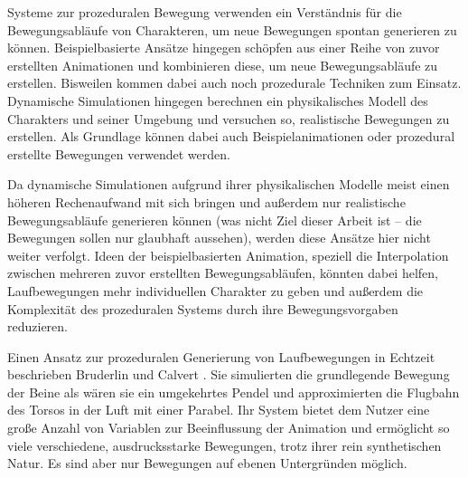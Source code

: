 Systeme zur prozeduralen Bewegung verwenden ein Verständnis für die Bewegungsabläufe von Charakteren, um neue Bewegungen spontan generieren zu können. Beispielbasierte Ansätze hingegen schöpfen aus einer Reihe von zuvor erstellten Animationen und kombinieren diese, um neue Bewegungsabläufe zu erstellen. Bisweilen kommen dabei auch noch prozedurale Techniken zum Einsatz. Dynamische Simulationen hingegen berechnen ein physikalisches Modell des Charakters und seiner Umgebung und versuchen so, realistische Bewegungen zu erstellen. Als Grundlage können dabei auch Beispielanimationen oder prozedural erstellte Bewegungen verwendet werden.

Da dynamische Simulationen aufgrund ihrer physikalischen Modelle meist einen höheren Rechenaufwand mit sich bringen und außerdem nur realistische Bewegungsabläufe generieren können (was nicht Ziel dieser Arbeit ist – die Bewegungen sollen nur glaubhaft aussehen), werden diese Ansätze hier nicht weiter verfolgt. Ideen der beispielbasierten Animation, speziell die Interpolation zwischen mehreren zuvor erstellten Bewegungsabläufen, könnten dabei helfen, Laufbewegungen mehr individuellen Charakter zu geben und außerdem die Komplexität des prozeduralen Systems durch ihre Bewegungsvorgaben reduzieren.

Einen Ansatz zur prozeduralen Generierung von Laufbewegungen in Echtzeit beschrieben Bruderlin und Calvert \cite{bruderlin1993interactive} \cite{bruderlin1996knowledge}. Sie simulierten die grundlegende Bewegung der Beine als wären sie ein umgekehrtes Pendel und approximierten die Flugbahn des Torsos in der Luft mit einer Parabel. Ihr System bietet dem Nutzer eine große Anzahl von Variablen zur Beeinflussung der Animation und ermöglicht so viele verschiedene, ausdrucksstarke Bewegungen, trotz ihrer rein synthetischen Natur. Es sind aber nur Bewegungen auf ebenen Untergründen möglich.

